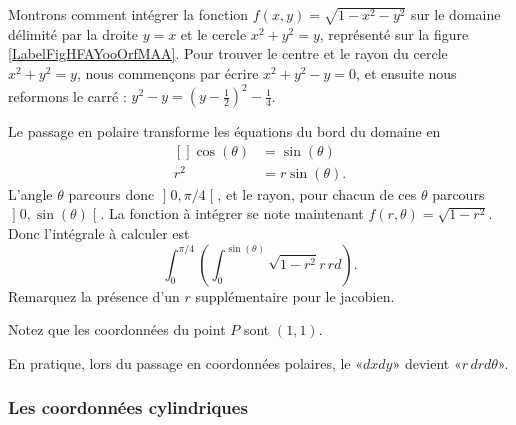 \begin{example}     \label{ExpmfDtAtV}
    Montrons comment intégrer la fonction $f(x,y)=\sqrt{1-x^2-y^2}$ sur le domaine délimité par la droite $y=x$ et le cercle $x^2+y^2=y$, représenté sur la figure \ref{LabelFigHFAYooOrfMAA}. Pour trouver le centre et le rayon du cercle $x^2+y^2=y$, nous commençons par écrire $x^2+y^2-y=0$, et ensuite nous reformons le carré : $y^2-y=(y-\frac{ 1 }{2})^2-\frac{1}{ 4 }$.

\newcommand{\CaptionFigHFAYooOrfMAA}{Passage en polaire pour intégrer sur un morceau de cercle.}


    Le passage en polaire transforme les équations du bord du domaine en
    \begin{equation}
        \begin{aligned}[]
            \cos(\theta)&=\sin(\theta)\\
            r^2&=r\sin(\theta).
        \end{aligned}
    \end{equation}
    L'angle $\theta$ parcours donc $\mathopen] 0 , \pi/4 \mathclose[$, et le rayon, pour chacun de ces $\theta$ parcours $\mathopen] 0 , \sin(\theta) \mathclose[$. La fonction à intégrer se note maintenant $f(r,\theta)=\sqrt{1-r^2}$. Donc l'intégrale à calculer est
    \begin{equation}		\label{PgOMRapIntMultFubiniBoutCercle}
        \int_{0}^{\pi/4}\left( \int_0^{\sin(\theta)}\sqrt{1-r^2}r\,rd \right).
    \end{equation}
    Remarquez la présence d'un $r$ supplémentaire pour le jacobien.

    Notez que les coordonnées du point $P$ sont $(1,1)$.
\end{example}

En pratique, lors du passage en coordonnées polaires, le «$dxdy$» devient «$r\,drd\theta$».

\subsubsection{Les coordonnées cylindriques}

